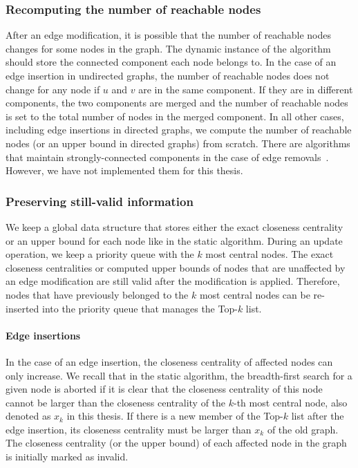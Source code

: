 \subsubsection{Recomputing the number of reachable nodes}
After an edge modification, it is possible that the number of reachable nodes changes for some nodes in the graph. The dynamic instance of the algorithm should store the connected component each node belongs to. In the case of an edge insertion in undirected graphs, the number of reachable nodes does not change for any node if $u$ and $v$ are in the same component. If they are in different components, the two components are merged and the number of reachable nodes is set to the total number of nodes in the merged component. In all other cases, including edge insertions in directed graphs, we compute the number of reachable nodes (or an upper bound in directed graphs) from scratch. There are algorithms that maintain strongly-connected components in the case of edge removals~\cite{lkacki2013improved,chechik2016decremental}. However, we have not implemented them for this thesis.

\subsubsection{Preserving still-valid information}
We keep a global data structure that stores either the exact closeness centrality or an upper bound for each node like in the static algorithm. During an update operation, we keep a priority queue with the $k$ most central nodes. The exact closeness centralities or computed upper bounds of nodes that are unaffected by an edge modification are still valid after the modification is applied. Therefore, nodes that have previously belonged to the $k$ most central nodes can be re-inserted into the priority queue that manages the Top-$k$ list.

\paragraph{Edge insertions}
In the case of an edge insertion, the closeness centrality of affected nodes can only increase.  We recall that in the static algorithm, the breadth-first search for a given node is aborted if it is clear that the closeness centrality of this node cannot be larger than the closeness centrality of the $k$-th most central node, also denoted as $x_k$ in this thesis. If there is a new member of the Top-$k$ list after the edge insertion, its closeness centrality must be larger than $x_k$ of the old graph. The closeness centrality (or the upper bound) of each affected node in the graph is initially marked as invalid. 

